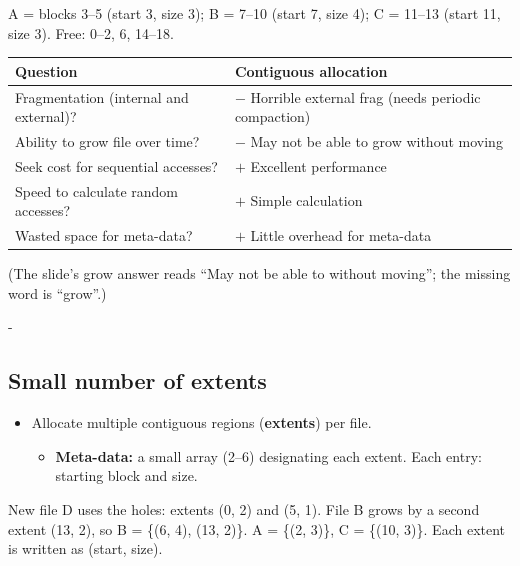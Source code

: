\documentclass[11pt,a4paper]{article}
\makeatletter
\newcommand{\keepspace}[1]{\par\penalty-100\begingroup
  \setlength{\dimen@}{#1}\dimen@ii\pagegoal\advance\dimen@ii-\pagetotal
  \ifdim\dimen@>\dimen@ii\ifdim\dimen@ii>\z@\vfil\fi\break\fi\endgroup}
\newcommand{\allocstrip}[2]{%
  \foreach \l [count=\i from 0] in {#1} {
    \node[ablk, f\l] (s\i) at (\i*0.74, #2) {\l};
  }
}
\newcommand{\stripindex}[2]{%
  \pgfmathtruncatemacro{\last}{#1-1}
  \foreach \i in {0,...,\last} {
    \node[font=\scriptsize, text=g3] at (\i*0.74, #2) {\i};
  }
}
\makeatother
\begin{document}
\begin{center}

{\small A = blocks 3--5 (start 3, size 3); B = 7--10 (start 7, size 4);
C = 11--13 (start 11, size 3). Free: 0--2, 6, 14--18.}
\end{center}

\begin{center}
\renewcommand{\arraystretch}{1.2}
\begin{tabularx}{\textwidth}{@{}lX@{}}
  \toprule
  \textbf{Question} & \textbf{Contiguous allocation} \\
  \midrule
  Fragmentation (internal and external)? & $-$ Horrible external frag (needs periodic compaction) \\
  Ability to grow file over time? & $-$ May not be able to grow without moving \\
  Seek cost for sequential accesses? & $+$ Excellent performance \\
  Speed to calculate random accesses? & $+$ Simple calculation \\
  Wasted space for meta-data? & $+$ Little overhead for meta-data \\
  \bottomrule
\end{tabularx}

{\small (The slide's grow answer reads ``May not be able to without moving'';
the missing word is ``grow''.)}
\end{center}


\keepspace{8\baselineskip}
\subsection{Small number of extents}

\begin{itemize}
  \item Allocate multiple contiguous regions (\textbf{extents}) per file.
  \begin{itemize}
    \item \textbf{Meta-data:} a small array (2--6) designating each extent.
          Each entry: starting block and size.
  \end{itemize}
\end{itemize}

\begin{center}

{\small New file D uses the holes: extents (0, 2) and (5, 1). File B grows by
a second extent (13, 2), so B = \{(6, 4), (13, 2)\}. A = \{(2, 3)\},
C = \{(10, 3)\}. Each extent is written as (start, size).}
\end{center}
\end{document}
